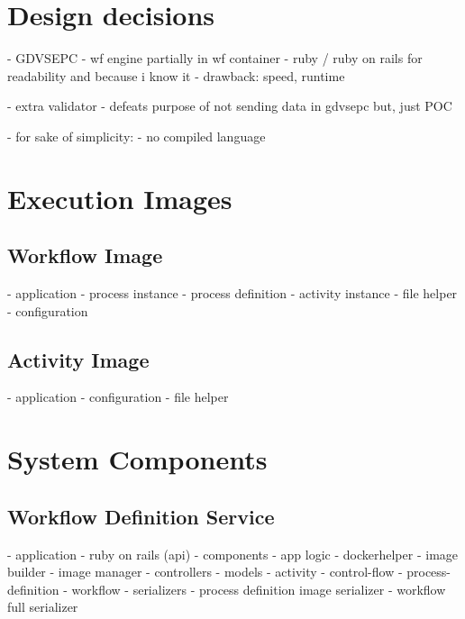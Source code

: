 
\section{Design decisions} %
\label{sec:design_decisions}
  - GDVSEPC
  - wf engine partially in wf container
  - ruby / ruby on rails for readability and because i know it
    - drawback: speed, runtime

  - extra validator
    - defeats purpose of not sending data in gdvsepc but, just POC

  - for sake of simplicity:
    - no compiled language

\section{Execution Images} %
\label{sec:execution_images}

  \subsection{Workflow Image} %
  \label{sub:workflow_container}
    - application
      - process instance
      - process definition
      - activity instance
      - file helper
      - configuration


  \subsection{Activity Image} %
  \label{sub:activity_containers}
    - application
      - configuration
      - file helper


\section{System Components} %
\label{sec:components_implementation}
  \subsection{Workflow Definition Service} %
    \label{sub:workflow_definition_service}
      - application
        - ruby on rails (api)
        - components
          - app logic
            - dockerhelper
            - image builder
            - image manager
          - controllers
          - models
            - activity
            - control-flow
            - process-definition
            - workflow
          - serializers
            - process definition image serializer
            - workflow full serializer


